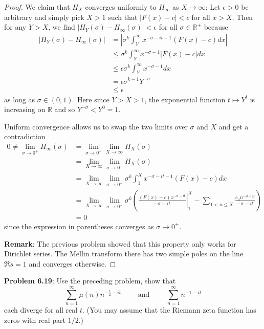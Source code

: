\documentclass[12pt]{article}
\newcommand{\R}{\mathbb{R}}
\newcommand{\Abs}[1]{\left| #1 \right|}
\begin{document}
\begin{proof}
We claim that $H_X$ converges uniformly to $H_\infty$ as $X \rightarrow \infty$: Let $\epsilon > 0$ be arbitrary and simply pick $X > 1$ such that $|F(x) - c| < \epsilon$ for all $x > X$. Then for any $Y > X$, we find $\Abs{ H_Y(\sigma) - H_\infty(\sigma) } < \epsilon$ for all $\sigma \in \R^+$ because
\begin{align*}
\Abs{ H_Y(\sigma) - H_\infty(\sigma) } &= \Abs{ \sigma^k \int_Y^\infty x^{-\sigma - i t -1} (F(x) - c) dx } \\
&\leq \sigma^k \int_Y^\infty x^{-\sigma-1} |F(x) - c| dx \\
&\leq \epsilon \sigma^k \int_Y^\infty x^{-\sigma-1} dx \\
&= \epsilon \sigma^{k-1} Y^{-\sigma} \\
&\leq \epsilon
\end{align*}
as long as $\sigma \in (0, 1)$. Here since $Y > X > 1$, the exponential function $t \mapsto Y^t$ is increasing on $\R$ and so $Y^{-\sigma} < Y^0 = 1$.

Uniform convergence allows us to swap the two limits over $\sigma$ and $X$ and get a contradiction
\begin{align*}
0 \not= \lim_{\sigma \rightarrow 0^+} H_\infty(\sigma) &= \lim_{\sigma \rightarrow 0^+} \lim_{X \rightarrow \infty} H_X(\sigma) \\
&= \lim_{X \rightarrow \infty} \lim_{\sigma \rightarrow 0^+} H_X(\sigma) \\
&= \lim_{X \rightarrow \infty} \lim_{\sigma \rightarrow 0^+} \sigma^k \int_1^X x^{-\sigma - i t -1} (F(x) - c) dx \\
&= \lim_{X \rightarrow \infty} \lim_{\sigma \rightarrow 0^+} \sigma^k \left(\left.\frac{(F(x) - c)x^{-\sigma-it}}{-\sigma - it}\right|_1^X - \sum_{1 < n \leq X} \frac{c_n n^{-\sigma - i t}}{-\sigma - it} \right) \\
&= 0
\end{align*}
since the expression in parentheses converges as $\sigma \rightarrow 0^+$.

\textbf{Remark}: The previous problem showed that this property only works for Dirichlet series. The Mellin transform there has two simple poles on the line $\Re s = 1$ and converges otherwise.
\end{proof}

\textbf{Problem 6.19}: Use the preceding problem, show that
$$\sum_{n=1}^{\infty} \mu(n) n^{-\frac12 - it} \qquad \text{ and } \qquad \sum_{n=1}^{\infty} n^{-1 - it}$$
each diverge for all real $t$. (You may assume that the Riemann zeta function has zeros with real part $1/2$.)
\end{document}
